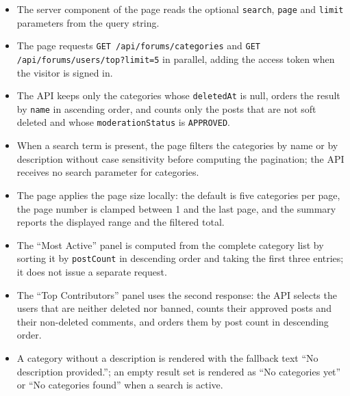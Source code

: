 \begin{itemize}[leftmargin=1.6em,topsep=3pt,itemsep=2pt,parsep=0pt,label=$\bullet$]
      \item The server component of the page reads the optional \texttt{search},
            \texttt{page} and \texttt{limit} parameters from the query string.
      \item The page requests \texttt{GET /\allowbreak{}api/\allowbreak{}forums/\allowbreak{}categories} and \texttt{GET /\allowbreak{}api/\allowbreak{}forums/\allowbreak{}users/\allowbreak{}top?\allowbreak{}limit=5} in parallel, adding the access token when the
            visitor is signed in.
      \item The API keeps only the categories whose \texttt{deletedAt} is null, orders the
            result by \texttt{name} in ascending order, and counts only the posts that are
            not soft deleted and whose \texttt{moderationStatus} is \texttt{APPROVED}.
      \item When a search term is present, the page filters the categories by name or by
            description without case sensitivity before computing the pagination; the API
            receives no search parameter for categories.
      \item The page applies the page size locally: the default is five categories per
            page, the page number is clamped between 1 and the last page, and the summary
            reports the displayed range and the filtered total.
      \item The ``Most Active'' panel is computed from the complete category list by
            sorting it by \texttt{postCount} in descending order and taking the first three
            entries; it does not issue a separate request.
      \item The ``Top Contributors'' panel uses the second response: the API selects the
            users that are neither deleted nor banned, counts their approved posts and
            their non-deleted comments, and orders them by post count in descending order.
      \item A category without a description is rendered with the fallback text ``No
            description provided.''; an empty result set is rendered as ``No categories
            yet'' or ``No categories found'' when a search is active.
\end{itemize}

